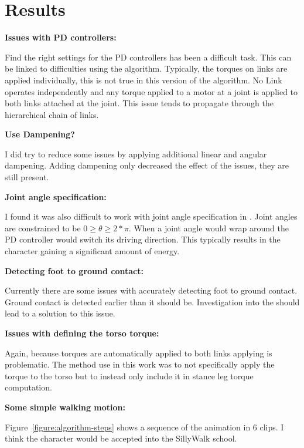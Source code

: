 

\section{Results}
\label{sec:results}


	\noindent \textbf{Issues with PD controllers:}
	
	Find the right settings for the PD controllers has been a difficult task. This can be linked to difficulties using the \Featherstone algorithm. Typically, the torques on links are applied individually, this is not true in this version of the \Featherstone algorithm. No Link operates independently and any torque applied to a motor at a joint is applied to both links attached at the joint. This issue tends to propagate through the hierarchical chain of links. 
	
	\noindent \textbf{Use Dampening?}
	
	I did try to reduce some issues by applying additional linear and angular dampening. Adding dampening only decreased the effect of the issues, they are still present.
	
	\noindent \textbf{Joint angle specification:}
	
	I found it was also difficult to work with joint angle specification in \bulletPhysics. Joint angles are constrained to be $0 \geq \theta \geq 2*\pi $. When a joint angle would wrap around the PD controller would switch its driving direction. This typically results in the character gaining a significant amount of energy.
	
	\noindent \textbf{Detecting foot to ground contact:}
	
	Currently there are some issues with accurately detecting foot to ground contact. Ground contact is detected earlier than it should be. Investigation into the \bulletPhysics should lead to a solution to this issue.
	
	\noindent \textbf{Issues with defining the torso torque:}
	
	Again, because torques are automatically applied to both links applying \torqueTorso is problematic. The method use in this work was to not specifically apply the torque to the torso but to instead only include it in stance leg torque computation.
	
	
	\noindent \textbf{Some simple walking motion:}
	
	Figure~\ref{figure:algorithm-steps} shows a sequence of the animation in $6$ clips. I think the character would be accepted into the SillyWalk school.
	
